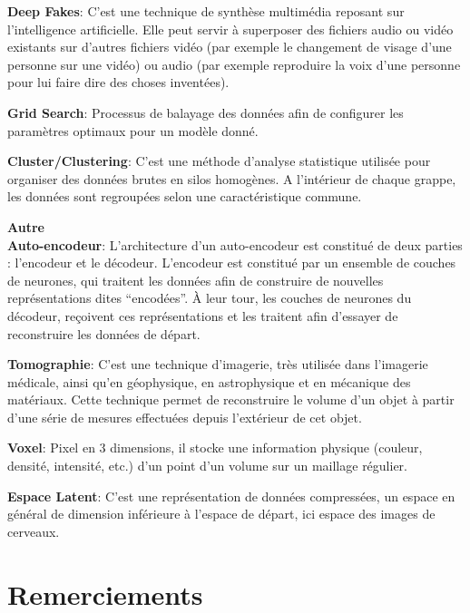 \documentclass[12pt, oneside, a4paper, titlepage]{article}
\begin{document}
\textbf{Deep Fakes}: C'est une technique de synthèse multimédia reposant sur l'intelligence artificielle. Elle peut servir à superposer des fichiers audio ou vidéo existants sur d'autres fichiers vidéo (par exemple le changement de visage d'une personne sur une vidéo) ou audio (par exemple reproduire la voix d'une personne pour lui faire dire des choses inventées).

\textbf{Grid Search}: Processus de balayage des données afin de configurer les paramètres optimaux pour un modèle donné.

\textbf{Cluster/Clustering}: C'est une méthode d'analyse statistique utilisée pour organiser des données brutes en silos homogènes. A l'intérieur de chaque grappe, les données sont regroupées selon une caractéristique commune.

\vspace{5mm}

\textbf{Autre}\\

\textbf{Auto-encodeur}: L’architecture d’un auto-encodeur est constitué de deux parties : l’encodeur et le décodeur. L’encodeur est constitué par un ensemble de couches de neurones, qui traitent les données afin de construire de nouvelles représentations dites “encodées”. À leur tour, les couches de neurones du décodeur, reçoivent ces représentations et les traitent afin d’essayer de reconstruire les données de départ.

\textbf{Tomographie}: C'est une technique d’imagerie, très utilisée dans l’imagerie médicale, ainsi qu’en géophysique, en astrophysique et en mécanique des matériaux. Cette technique permet de reconstruire le volume d’un objet à partir d’une série de mesures effectuées depuis l’extérieur de cet objet.

\textbf{Voxel}: Pixel en 3 dimensions, il stocke une information physique (couleur, densité, intensité, etc.) d'un point d'un volume sur un maillage régulier.

\textbf{Espace Latent}: C'est une représentation de données compressées, un espace en général de dimension inférieure à l'espace de départ, ici espace des images de cerveaux. 

\newpage
\section*{Remerciements}

\vspace{2cm}
\end{document}
